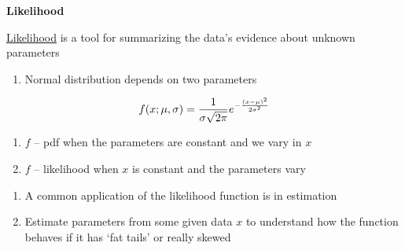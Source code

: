 \documentclass[aspectratio=1610,pdftex,dvipsnames,compress,xcolor={dvipsnames}]{beamer}
\newcommand{\acs}{\acrshort} %
\begin{document}
\begin{frame}[plain]{}
    \centering\LARGE\textbf{Likelihood}
\end{frame}


\addtocounter{framenumber}{-1}
\begin{frame}{\href{https://uidaho.pressbooks.pub/riskassessment/chapter/likelihood/}{Likelihood} is a tool for summarizing the data’s evidence about unknown parameters}
    \begin{enumerate}[series=outerlist,topsep=0pt,itemsep=3pt,leftmargin=*,label=(\arabic*)]
        \item[]Normal distribution depends on two parameters
    \end{enumerate}

    \vspace*{\fill}

    \begin{equation}
        \Large
        f(x;\mu,\sigma) = \frac{1}{\sigma\sqrt{2\pi}} e^{-\frac{(x-\mu)^2}{2\sigma^2}}
    \end{equation}

    \vspace*{\fill}

    \begin{enumerate}[series=outerlist,topsep=0pt,itemsep=11pt,leftmargin=*,label=(\arabic*)]
        \item[] $f$ -- \acs{pdf} when the parameters are constant and we vary in $x$
        \item[] $f$ -- likelihood when $x$ is constant and the parameters vary
    \end{enumerate}

    \vspace*{\fill}

    \begin{enumerate}[series=outerlist,topsep=0pt,itemsep=11pt,leftmargin=*,label=(\arabic*)]
        \item[]A common application of the likelihood function is in estimation
        \item[]Estimate parameters from some given data $x$ to understand how the function behaves if it has `fat tails' or really skewed
    \end{enumerate}
\end{frame}
\end{document}
